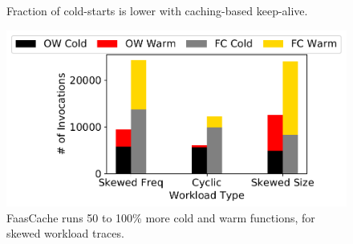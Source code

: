 \begin{figure}[t]
  \centering
  \begin{minipage}[c]{0.7\linewidth}
  \hfill
  \hfill
    \vspace*{\myfigspace}
    \caption[cold-starts]{Fraction of cold-starts is lower with caching-based keep-alive. } %
      \vspace*{\myfigspace}
      \label{fig:cold-starts-all}
    \end{minipage}
    \hfill
    \begin{minipage}[c]{0.29\linewidth}
      \includegraphics[width=1\textwidth]{../graphs/litmus_tests/litmus_2_stacked.pdf}
      \caption{FaasCache runs 50 to 100\% more cold and warm functions, for skewed workload traces.}
              \label{fig:litmus_2}
    \end{minipage}
\end{figure}


